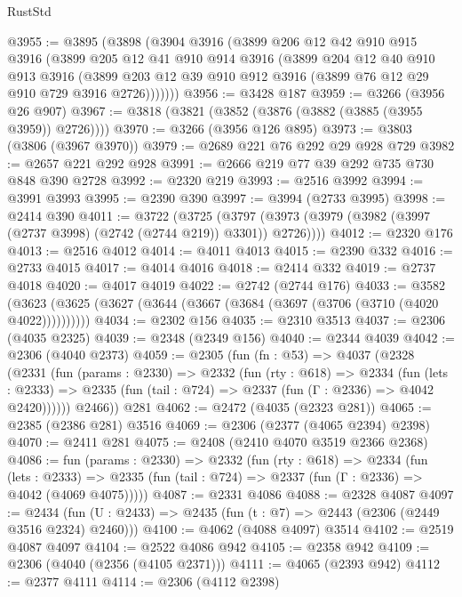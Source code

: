 \begin{lexlean}{RustStd}
\begin{coremodule}
@3955 := @3895
    (@3898
      (@3904
        @3916
        (@3899
          @206
          @12
          @42
          @910
          @915
          @3916
          (@3899
            @205
            @12
            @41
            @910
            @914
            @3916
            (@3899
              @204
              @12
              @40
              @910
              @913
              @3916
              (@3899 @203 @12 @39 @910 @912 @3916 (@3899 @76 @12 @29 @910 @729 @3916 @2726)))))))
@3956 := @3428 @187
@3959 := @3266 (@3956 @26 @907)
@3967 := @3818 (@3821 (@3852 (@3876 (@3882 (@3885 (@3955 @3959)) @2726))))
@3970 := @3266 (@3956 @126 @895)
@3973 := @3803 (@3806 (@3967 @3970))
@3979 := @2689 @221 @76 @292 @29 @928 @729
@3982 := @2657 @221 @292 @928
@3991 := @2666 @219 @77 @39 @292 @735 @730 @848 @390 @2728
@3992 := @2320 @219
@3993 := @2516 @3992
@3994 := @3991 @3993
@3995 := @2390 @390
@3997 := @3994 (@2733 @3995)
@3998 := @2414 @390
@4011 := @3722
    (@3725 (@3797 (@3973 (@3979 (@3982 (@3997 (@2737 @3998) (@2742 (@2744 @219)) @3301)) @2726))))
@4012 := @2320 @176
@4013 := @2516 @4012
@4014 := @4011 @4013
@4015 := @2390 @332
@4016 := @2733 @4015
@4017 := @4014 @4016
@4018 := @2414 @332
@4019 := @2737 @4018
@4020 := @4017 @4019
@4022 := @2742 (@2744 @176)
@4033 := @3582 (@3623 (@3625 (@3627 (@3644 (@3667 (@3684 (@3697 (@3706 (@3710 (@4020 @4022))))))))))
@4034 := @2302 @156
@4035 := @2310 @3513
@4037 := @2306 (@4035 @2325)
@4039 := @2348 (@2349 @156)
@4040 := @2344 @4039
@4042 := @2306 (@4040 @2373)
@4059 := @2305
    (fun (fn : @53) =>
    @4037
      (@2328
        (@2331
          (fun (params : @2330) =>
          @2332
            (fun (rty : @618) =>
            @2334
              (fun (lets : @2333) =>
              @2335 (fun (tail : @724) => @2337 (fun (Γ : @2336) => @4042 @2420))))))
        @2466))
    @281
@4062 := @2472 (@4035 (@2323 @281))
@4065 := @2385 (@2386 @281) @3516
@4069 := @2306 (@2377 (@4065 @2394) @2398)
@4070 := @2411 @281
@4075 := @2408 (@2410 @4070 @3519 @2366 @2368)
@4086 := fun (params : @2330) =>
  @2332
    (fun (rty : @618) =>
    @2334
      (fun (lets : @2333) =>
      @2335 (fun (tail : @724) => @2337 (fun (Γ : @2336) => @4042 (@4069 @4075)))))
@4087 := @2331 @4086
@4088 := @2328 @4087
@4097 := @2434 (fun (U : @2433) => @2435 (fun (t : @7) => @2443 (@2306 (@2449 @3516 @2324) @2460)))
@4100 := @4062 (@4088 @4097) @3514
@4102 := @2519 @4087 @4097
@4104 := @2522 @4086 @942
@4105 := @2358 @942
@4109 := @2306 (@4040 (@2356 (@4105 @2371)))
@4111 := @4065 (@2393 @942)
@4112 := @2377 @4111
@4114 := @2306 (@4112 @2398)

\end{coremodule}
\end{lexlean}
